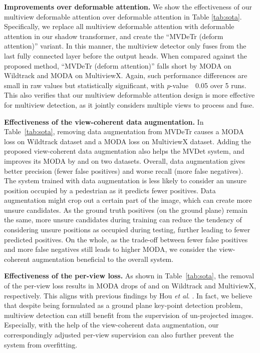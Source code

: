\documentclass[sigconf,authorversion,nonacm]{acmart}
\newcommand{\etal}{\textit{et al}. }
\begin{document}
\textbf{Improvements over deformable attention.}
We show the effectiveness of our multiview deformable attention over deformable attention \cite{zhu2021deformable} in Table \ref{tab:sota}. Specifically, we replace all multiview deformable attention with deformable attention in our shadow transformer, and create the ``MVDeTr (deform attention)'' variant. In this manner, the multiview detector only fuses from the last fully connected layer before the output heads. 
When compared against the proposed method, ``MVDeTr (deform attention)'' falls short by   MODA on Wildtrack and  MODA on MultiviewX. Again, such performance differences are small in raw values but statistically significant, with \textit{p}-value~~0.05 over 5 runs. 
This also verifies that our multiview deformable attention design is more effective for multiview detection, as it jointly considers multiple views to process and fuse.




\textbf{Effectiveness of the view-coherent data augmentation.}
In Table~\ref{tab:sota}, removing data augmentation from MVDeTr causes a  MODA loss on Wildtrack dataset and a  MODA loss on MultiviewX dataset. 
Adding the proposed view-coherent data augmentation also helps the MVDet system, and improves its MODA by  and  on two datasets. 
Overall, data augmentation gives better precision (fewer false positives) and worse recall (more false negatives). The system trained with data augmentation is less likely to consider an unsure position occupied by a pedestrian as it predicts fewer positives. Data augmentation might crop out a certain part of the image, which can create more unsure candidates. As the ground truth positives (on the ground plane) remain the same, more unsure candidates during training can reduce the tendency of considering unsure positions as occupied during testing, further leading to fewer predicted positives. On the whole, as the trade-off between fewer false positives and more false negatives still leads to higher MODA, we consider the view-coherent augmentation beneficial to the overall system.







\textbf{Effectiveness of the per-view loss.}
As shown in Table~\ref{tab:sota}, the removal of the per-view loss results in MODA drops of  and  on Wildtrack and MultiviewX, respectively. This aligns with previous findings by Hou \etal \cite{hou2020multiview}. In fact, we believe that despite being formulated as a ground plane key-point detection problem, multiview detection can still benefit from the supervision of un-projected images. Especially, with the help of the view-coherent data augmentation, our correspondingly adjusted per-view supervision can also further prevent the system from overfitting. 
\end{document}
